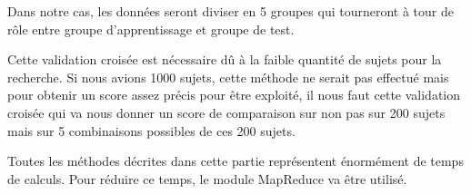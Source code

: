 Dans notre cas, les données seront diviser en 5 groupes qui tourneront à tour de rôle entre groupe d'apprentissage et groupe de test. 

Cette validation croisée est nécessaire dû à la faible quantité de sujets pour la recherche. Si nous avions 1000 sujets, cette méthode ne serait pas effectué mais pour obtenir un score assez précis pour être exploité, il nous faut cette validation croisée qui va nous donner un score de comparaison sur non pas sur 200 sujets mais sur 5 combinaisons possibles de ces 200 sujets. 

Toutes les méthodes décrites dans cette partie représentent énormément de temps de calculs.
Pour réduire ce temps, le module MapReduce va être utilisé. 